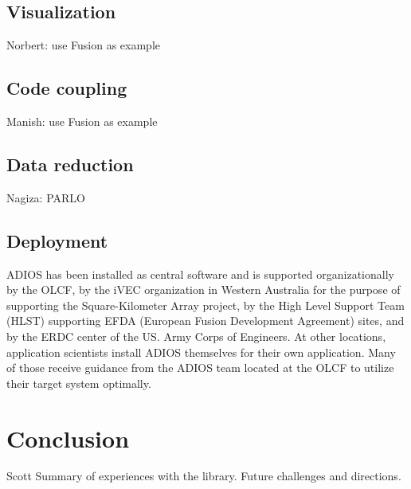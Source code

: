 \subsection{Visualization}
{\color {red}Norbert: use Fusion as example}



\subsection{Code coupling}
{\color {red}Manish: use Fusion as example}



\subsection{Data reduction}
{\color {red}Nagiza: PARLO}




\subsection{Deployment}
ADIOS has been installed as central software and is supported organizationally by the OLCF, by the iVEC organization in Western Australia for the purpose of supporting the Square-Kilometer Array project, by the High Level Support Team (HLST) supporting EFDA (European Fusion Development Agreement) sites, and by the ERDC center of the US. Army Corps of Engineers. At other locations, application scientists install ADIOS themselves for their own application. Many of those receive guidance from the ADIOS team located at the OLCF to utilize their target system optimally.





\section{Conclusion}
{\color {red}Scott}
{\color {red}Summary of experiences with the library. Future challenges and directions.}


